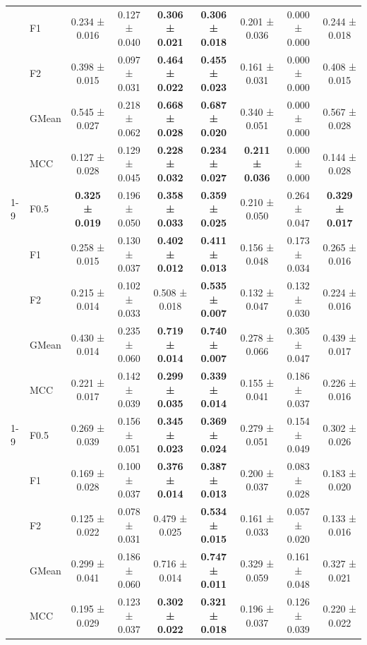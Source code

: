\begin{table}[H]
{\begin{tabular}{llccccccc}
 & F1 & 0.234 ± 0.016 & 0.127 ± 0.040 & \textbf{0.306 ± 0.021} & \textbf{0.306 ± 0.018} & 0.201 ± 0.036 & 0.000 ± 0.000 & 0.244 ± 0.018 \\
 & F2 & 0.398 ± 0.015 & 0.097 ± 0.031 & \textbf{0.464 ± 0.022} & \textbf{0.455 ± 0.023} & 0.161 ± 0.031 & 0.000 ± 0.000 & 0.408 ± 0.015 \\
 & GMean & 0.545 ± 0.027 & 0.218 ± 0.062 & \textbf{0.668 ± 0.028} & \textbf{0.687 ± 0.020} & 0.340 ± 0.051 & 0.000 ± 0.000 & 0.567 ± 0.028 \\
 & MCC & 0.127 ± 0.028 & 0.129 ± 0.045 & \textbf{0.228 ± 0.032} & \textbf{0.234 ± 0.027} & \textbf{0.211 ± 0.036} & 0.000 ± 0.000 & 0.144 ± 0.028 \\
\cline{1-9}
\multirow[t]{5}{*}{LGBM()} & F0.5 & \textbf{0.325 ± 0.019} & 0.196 ± 0.050 & \textbf{0.358 ± 0.033} & \textbf{0.359 ± 0.025} & 0.210 ± 0.050 & 0.264 ± 0.047 & \textbf{0.329 ± 0.017} \\
 & F1 & 0.258 ± 0.015 & 0.130 ± 0.037 & \textbf{0.402 ± 0.012} & \textbf{0.411 ± 0.013} & 0.156 ± 0.048 & 0.173 ± 0.034 & 0.265 ± 0.016 \\
 & F2 & 0.215 ± 0.014 & 0.102 ± 0.033 & 0.508 ± 0.018 & \textbf{0.535 ± 0.007} & 0.132 ± 0.047 & 0.132 ± 0.030 & 0.224 ± 0.016 \\
 & GMean & 0.430 ± 0.014 & 0.235 ± 0.060 & \textbf{0.719 ± 0.014} & \textbf{0.740 ± 0.007} & 0.278 ± 0.066 & 0.305 ± 0.047 & 0.439 ± 0.017 \\
 & MCC & 0.221 ± 0.017 & 0.142 ± 0.039 & \textbf{0.299 ± 0.035} & \textbf{0.339 ± 0.014} & 0.155 ± 0.041 & 0.186 ± 0.037 & 0.226 ± 0.016 \\
\cline{1-9}
\multirow[t]{5}{*}{LogisticRegression()} & F0.5 & 0.269 ± 0.039 & 0.156 ± 0.051 & \textbf{0.345 ± 0.023} & \textbf{0.369 ± 0.024} & 0.279 ± 0.051 & 0.154 ± 0.049 & 0.302 ± 0.026 \\
 & F1 & 0.169 ± 0.028 & 0.100 ± 0.037 & \textbf{0.376 ± 0.014} & \textbf{0.387 ± 0.013} & 0.200 ± 0.037 & 0.083 ± 0.028 & 0.183 ± 0.020 \\
 & F2 & 0.125 ± 0.022 & 0.078 ± 0.031 & 0.479 ± 0.025 & \textbf{0.534 ± 0.015} & 0.161 ± 0.033 & 0.057 ± 0.020 & 0.133 ± 0.016 \\
 & GMean & 0.299 ± 0.041 & 0.186 ± 0.060 & 0.716 ± 0.014 & \textbf{0.747 ± 0.011} & 0.329 ± 0.059 & 0.161 ± 0.048 & 0.327 ± 0.021 \\
 & MCC & 0.195 ± 0.029 & 0.123 ± 0.037 & \textbf{0.302 ± 0.022} & \textbf{0.321 ± 0.018} & 0.196 ± 0.037 & 0.126 ± 0.039 & 0.220 ± 0.022 \\

\end{tabular}}
\end{table}
